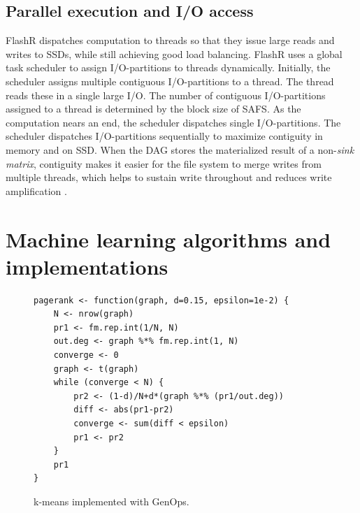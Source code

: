 


\subsection{Parallel execution and I/O access}
FlashR dispatches computation to threads so that they
issue large reads and writes to SSDs, while still achieving good load balancing.
FlashR uses a global task scheduler to assign I/O-partitions to threads
dynamically. Initially, the scheduler assigns multiple contiguous I/O-partitions
to a thread. The thread reads these in a single large I/O.
The number of contiguous I/O-partitions assigned to a thread is determined by
the block size of SAFS.
As the computation nears an end, the scheduler dispatches single I/O-partitions. 
The scheduler dispatches I/O-partitions sequentially to maximize contiguity in memory
and on SSD.
When the DAG stores the materialized result of a non-\textit{sink matrix}, 
contiguity makes it easier for the file system to merge
writes from multiple threads, which helps to sustain write throughout and reduces
write amplification \cite{ripq}.


\section{Machine learning algorithms and implementations}

\begin{figure}
\centering
	\footnotesize
	\centering
	\begin{verbatim}
pagerank <- function(graph, d=0.15, epsilon=1e-2) {
	N <- nrow(graph)
	pr1 <- fm.rep.int(1/N, N)
	out.deg <- graph %*% fm.rep.int(1, N)
	converge <- 0
	graph <- t(graph)
	while (converge < N) {
		pr2 <- (1-d)/N+d*(graph %*% (pr1/out.deg))
		diff <- abs(pr1-pr2)
		converge <- sum(diff < epsilon)
		pr1 <- pr2
	}
	pr1
}
	\end{verbatim}
	\label{fig:code}
	\caption{k-means implemented with GenOps.}
	\label{fig:kmeans}
  \vspace{-8pt}
\end{figure}
